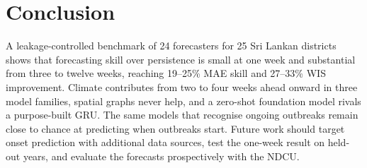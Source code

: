 \section{Conclusion}

A leakage-controlled benchmark of 24 forecasters for 25 Sri Lankan districts shows that forecasting skill over persistence is small at one week and substantial from three to twelve weeks, reaching 19--25\% MAE skill and 27--33\% WIS improvement. Climate contributes from two to four weeks ahead onward in three model families, spatial graphs never help, and a zero-shot foundation model rivals a purpose-built GRU. The same models that recognise ongoing outbreaks remain close to chance at predicting when outbreaks start. Future work should target onset prediction with additional data sources, test the one-week result on held-out years, and evaluate the forecasts prospectively with the NDCU.





